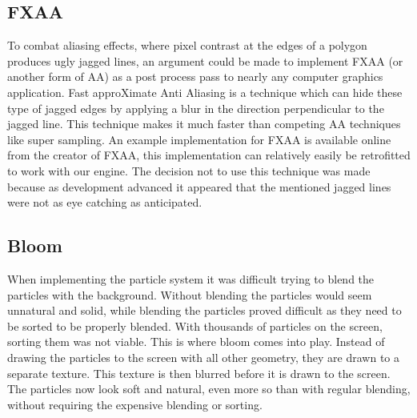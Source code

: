 \subsection{FXAA}
To combat aliasing effects, where pixel contrast at the edges of a polygon produces ugly jagged lines, an argument could be made to implement FXAA (or another form of AA) as a post process pass to nearly any computer graphics application. Fast approXimate Anti Aliasing is a technique which can hide these type of jagged edges by applying a blur in the direction perpendicular to the jagged line. This technique makes it much faster than competing AA techniques like super sampling. An example implementation for FXAA is available online from the creator of FXAA, this implementation can relatively easily be retrofitted to work with our engine. The decision not to use this technique was made because as development advanced it appeared that the mentioned jagged lines were not as eye catching as anticipated.
\subsection{Bloom}
When implementing the particle system it was difficult trying to blend the particles with the background. Without blending the particles would seem unnatural and solid, while blending the particles proved difficult as they need to be sorted to be properly blended. With thousands of particles on the screen, sorting them was not viable. This is where bloom comes into play. Instead of drawing the particles to the screen with all other geometry, they are drawn to a separate texture. This texture is then blurred before it is drawn to the screen. The particles now look soft and natural, even more so than with regular blending, without requiring the expensive blending or sorting.   
